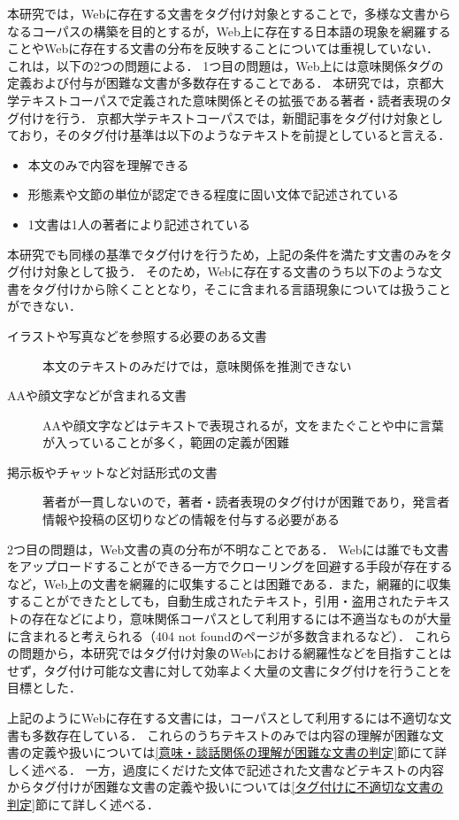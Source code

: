 \documentclass[japanese]{jnlp_1.4}
\begin{document}
本研究では，Webに存在する文書をタグ付け対象とすることで，多様な文書からなるコーパスの構築を目的とするが，Web上に存在する日本語の現象を網羅することやWebに存在する文書の分布を反映することについては重視していない．
これは，以下の2つの問題による．
1つ目の問題は，Web上には意味関係タグの定義および付与が困難な文書が多数存在することである．
本研究では，京都大学テキストコーパスで定義された意味関係とその拡張である著者・読者表現のタグ付けを行う．
京都大学テキストコーパスでは，新聞記事をタグ付け対象としており，そのタグ付け基準は以下のようなテキストを前提としていると言える．
\begin{itemize}
\item 本文のみで内容を理解できる
\item 形態素や文節の単位が認定できる程度に固い文体で記述されている
\item 1文書は1人の著者により記述されている
\end{itemize}
本研究でも同様の基準でタグ付けを行うため，上記の条件を満たす文書のみをタグ付け対象として扱う．
そのため，Webに存在する文書のうち以下のような文書をタグ付けから除くこととなり，そこに含まれる言語現象については扱うことができない．
\begin{description}
\item [イラストや写真などを参照する必要のある文書] 本文のテキストのみだけでは，意味関係を推測できない
\item [AAや顔文字などが含まれる文書] AAや顔文字などはテキストで表現されるが，文をまたぐことや中に言葉が入っていることが多く，範囲の定義が困難
\item [掲示板やチャットなど対話形式の文書] 著者が一貫しないので，著者・読者表現のタグ付けが困難であり，発言者情報や投稿の区切りなどの情報を付与する必要がある
\end{description}
2つ目の問題は，Web文書の真の分布が不明なことである．
Webには誰でも文書をアップロードすることができる一方でクローリングを回避する手段が存在するなど，Web上の文書を網羅的に収集することは困難である．また，網羅的に収集することができたとしても，自動生成されたテキスト，引用・盗用されたテキストの存在などにより，意味関係コーパスとして利用するには不適当なものが大量に含まれると考えられる（404 not foundのページが多数含まれるなど）．
これらの問題から，本研究ではタグ付け対象のWebにおける網羅性などを目指すことはせず，タグ付け可能な文書に対して効率よく大量の文書にタグ付けを行うことを目標とした．

上記のようにWebに存在する文書には，コーパスとして利用するには不適切な文書も多数存在している．
これらのうちテキストのみでは内容の理解が困難な文書の定義や扱いについては\ref{意味・談話関係の理解が困難な文書の判定}節にて詳しく述べる．
一方，過度にくだけた文体で記述された文書などテキストの内容からタグ付けが困難な文書の定義や扱いについては\ref{タグ付けに不適切な文書の判定}節にて詳しく述べる．
\end{document}
